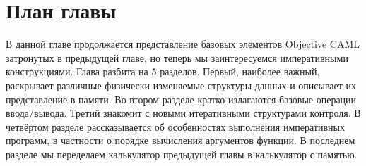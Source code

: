 \section{План главы}

В данной главе продолжается представление базовых элементов Objective CAML
затронутых в предыдущей главе, но теперь мы заинтересуемся императивными
конструкциями. Глава разбита на 5 разделов. Первый, наиболее важный, раскрывает
различные физически изменяемые структуры данных и описывает их представление в
памяти. Во втором разделе кратко излагаются базовые операции ввода/вывода.
Третий знакомит с новыми итеративными структурами контроля. В четвёртом разделе
рассказывается об особенностях выполнения императивных программ, в частности о
порядке вычисления аргументов функции. В последнем разделе мы переделаем
калькулятор предыдущей главы в калькулятор с памятью.